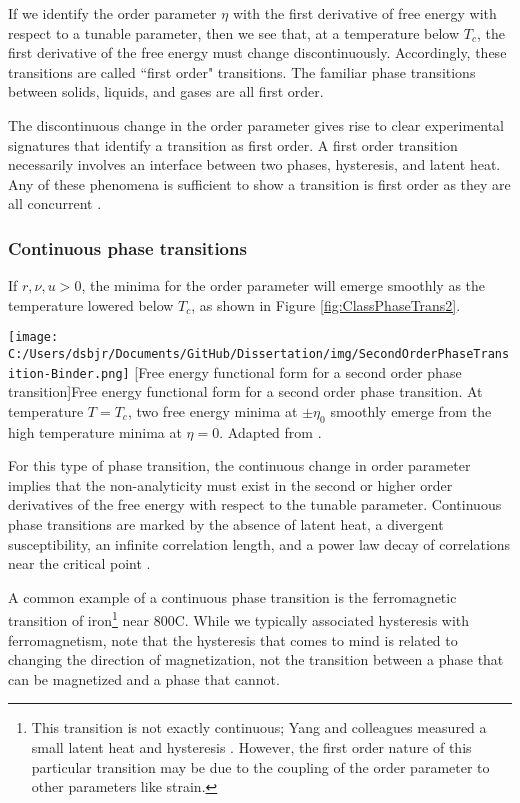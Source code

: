 If we identify the order parameter $\eta$ with the first derivative of free energy with respect to a tunable parameter, then we see that, at a temperature below $T_{c}$, the first derivative of the free energy must change discontinuously. Accordingly, these transitions are called ``first order" transitions. The familiar phase transitions between solids, liquids, and gases are all first order. 

The discontinuous change in the order parameter gives rise to clear experimental signatures that identify a transition as first order. A first order transition necessarily involves an interface between two phases, hysteresis, and latent heat. Any of these phenomena is sufficient to show a transition is first order as they are all concurrent \cite{Mnyukh2011}.

\subsubsection{Continuous phase transitions}

If $r,\nu,u > 0$, the minima for the order parameter will emerge smoothly as the temperature lowered below $T_{c}$, as shown in Figure \ref{fig:ClassPhaseTrans2}.

\begin{centering}
\texttt{[image: C:/Users/dsbjr/Documents/GitHub/Dissertation/img/SecondOrderPhaseTransition-Binder.png]}
  \captionsetup{width=0.9\textwidth}
  [Free energy functional form for a second order phase transition]{Free energy functional form for a second order phase transition. At temperature  $T = T_{c}$, two free energy minima at $\pm \eta_{0}$ smoothly emerge from the high temperature minima at $\eta = 0$.  Adapted from \cite{Binder1987}.}
  \label{fig:ClassPhaseTrans2}
\end{centering}

For this type of phase transition, the continuous change in order parameter implies that the non-analyticity must exist in the second or higher order derivatives of the free energy with respect to the tunable parameter. Continuous phase transitions are marked by the absence of latent heat, a divergent susceptibility, an infinite correlation length, and a power law decay of correlations near the critical point \cite{Cardy1996}.

A common example of a continuous phase transition is the ferromagnetic transition of iron\footnote{This transition is not exactly continuous; Yang and colleagues measured a small latent heat and hysteresis \cite{Yang2008}. However, the first order nature of this particular transition may be due to the coupling of the order parameter to other parameters like strain.} near 800\degree C. While we typically associated hysteresis with ferromagnetism, note that the hysteresis that comes to mind is related to changing the direction of magnetization, not the transition between a phase that can be magnetized and a phase that cannot. 

